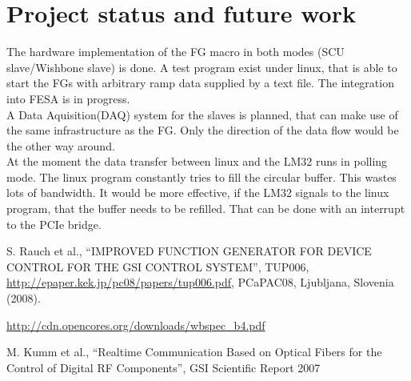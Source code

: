 \documentclass[a4paper,
              ]{jacow}
\begin{document}
\section{Project status and future work}
The hardware implementation of the FG macro in both modes (SCU slave/Wishbone slave) is done. A test program exist under linux, that is able to start the FGs with arbitrary ramp data supplied by a text file. The integration into FESA is in progress.\\
A Data Aquisition(DAQ) system for the slaves is planned, that can make use of the same infrastructure as the FG. Only the direction of the data flow would be the other way around.\\ 
At the moment the data transfer between linux and the LM32 runs in polling mode. The linux program constantly tries to fill the circular buffer. This wastes lots of bandwidth. It would be more effective, if the LM32 signals to the linux program, that the buffer needs to be refilled. That can be done with an interrupt to the PCIe bridge.


%
%
\iftrue   %
	\raggedend
\fi


\iffalse  %
	\newpage
	\printbibliography

\else
\begin{thebibliography}{9}   %

    S. Rauch et al., ``IMPROVED FUNCTION GENERATOR FOR
	 DEVICE CONTROL FOR THE GSI CONTROL SYSTEM'',
    TUP006, \url{http://epaper.kek.jp/pc08/papers/tup006.pdf}, PCaPAC08, Ljubljana, Slovenia (2008).

	\url{http://cdn.opencores.org/downloads/wbspec_b4.pdf}

  M. Kumm et al., ``Realtime Communication Based on Optical Fibers for the Control of Digital RF Components'', 
  GSI Scientific Report 2007

\end{thebibliography}
\fi
\end{document}
